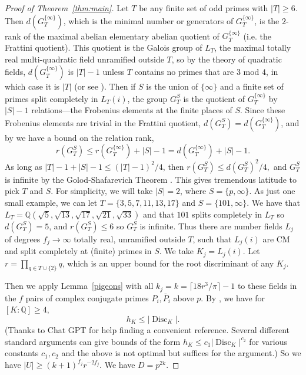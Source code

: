 \documentclass[11pt,reqno]{amsart}
\numberwithin{equation}{section}
\theoremstyle{definition}
\theoremstyle{remark}
\newcommand{\on}{\operatorname}
\newcommand{\Q}{\mathbb{Q}}
\newcommand{\Disc}{\on{Disc}}
\begin{document}
\begin{proof}[Proof of Theorem~\ref{thm:main}]
Let $T$ be any finite set of odd primes with $|T|\geq 6.$
Then $d(G_T^{\{\infty\}})$, which is the minimal number or generators of $G_T^{\{\infty\}}$, is the $2$-rank of the maximal abelian elementary abelian quotient of $G_T^{\{\infty\}}$ (i.e. the Frattini quotient).  This quotient is the Galois group of $L_T$, the maximal totally real multi-quadratic field unramified outside $T$, so by the theory of quadratic fields, $d(G_T^{\{\infty\}})$ is $|T|-1$ unless $T$ contains no primes that are 3 mod $4$, in which case it is $|T|$ (or see \cite[Theorem 11.8]{Koch2002GaloisTheoryPExtensions}).  Then if $S$ is the union of $\{\infty\}$ and a finite set of primes split  completely in $L_T(i)$, the group
$G_T^S$ is the quotient of $G_T^{\{\infty\}}$ by $|S|-1$ relations---the Frobenius elements at the finite places of $S$.  Since these Frobenius elements are trivial in the Frattini quotient, $d(G_T^S)=d(G_T^{\{\infty\}})$, and by \cite[Theorems 11.5,11.8]{Koch2002GaloisTheoryPExtensions}
we have a bound on the relation rank, $$r(G_T^S)\leq r(G_T^{\{\infty\}})+|S|-1 =
d(G_T^{\{\infty\}})+|S|-1.$$ 
As long as
$
|T|-1+|S|-1\leq (|T|-1)^2/4$, then
$r(G_T^S)\leq
d(G_T^S)^2/4,
$
and $G_T^S$ is infinite by the Golod-Shafarevich Theorem \cite{GolodShafarevich1964ClassFieldTower}.
This gives tremendous latitude to pick $T$ and $S$. 
For simplicity, we will take $|S|=2$, where $S=\{p,\infty\}$.  As just one small example, we can let
$T=\{3,5,7,11,13,17\}$ and $S=\{101,\infty\}$.  We have that $L_T=\Q(\sqrt{5},\sqrt{13},\sqrt{17},\sqrt{21},\sqrt{33})$ and that $101$ splits completely in $L_T$  so $d(G_T^S)=5$, and $r(G_T^S)\leq 6$ so 
$G_T^S$ is infinite.  Thus there are number fields $L_j$ of degrees $f_j\rightarrow\infty$ totally real, unramified outside $T$, such that $L_j(i)$ are CM and split completely at (finite) primes in $S$.  We take $K_j=L_j(i).$  Let $r=\prod_{q\in T\cup\{2\}}q $, which is an upper bound for the root discriminant of any $K_j$.

Then we apply Lemma~\ref{pigeons} with all $k_j=k=\lceil 18r^3/\pi\rceil-1$ to these fields in the $f$ pairs of complex conjugate primes $P_i,\bar{P}_i$ above $p.$  
By \cite[p. 143, (7)]{BorelPrasad1989Finiteness}, we have for $[K:\Q]\geq 4,$
$$
h_K\leq |\Disc_K|.
$$
(Thanks to Chat GPT for help finding a convenient reference.  Several different standard arguments can give bounds of the form $h_K\leq c_1|\Disc_K|^{c_2}$ for various constants $c_1,c_2$ and the above is not optimal but suffices for the argument.)
So we have $|U|\geq (k+1)^{f_j} r^{-2f_j}.$  We have $D=p^{2k}$.


\end{proof}
\end{document}
